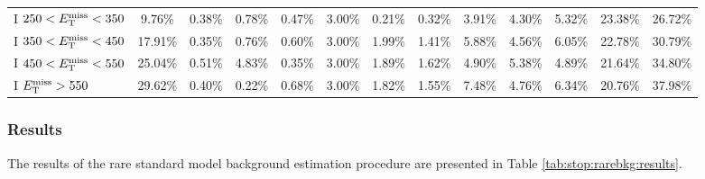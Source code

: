 \begin{table}
\begin{tabular}{|l|ccccccccccc|c|}
 I $250<E_\text{T}^\text{miss}<350$ & 9.76\%  & 0.38\%  & 0.78\%  & 0.47\%  & 3.00\%  & 0.21\%  & 0.32\%  & 3.91\%  & 4.30\%  & 5.32\%  & 23.38\% & 26.72\% \\
 I $350<E_\text{T}^\text{miss}<450$ & 17.91\% & 0.35\%  & 0.76\%  & 0.60\%  & 3.00\%  & 1.99\%  & 1.41\%  & 5.88\%  & 4.56\%  & 6.05\%  & 22.78\% & 30.79\% \\
 I $450<E_\text{T}^\text{miss}<550$ & 25.04\% & 0.51\%  & 4.83\%  & 0.35\%  & 3.00\%  & 1.89\%  & 1.62\%  & 4.90\%  & 5.38\%  & 4.89\%  & 21.64\% & 34.80\% \\
 I $E_\text{T}^\text{miss}>550$     & 29.62\% & 0.40\%  & 0.22\%  & 0.68\%  & 3.00\%  & 1.82\%  & 1.55\%  & 7.48\%  & 4.76\%  & 6.34\%  & 20.76\% & 37.98\% \\
\hline
\end{tabular}
\end{table}

\subsubsection{Results}
\label{sssec:stop:rarebkg:results}

The results of the rare standard model background estimation procedure
are presented in Table \ref{tab:stop:rarebkg:results}.

